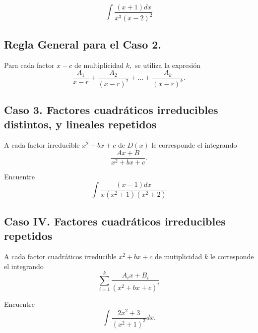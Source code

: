  \begin{resuelto}
  \label{ayr:33.8}
  $$
  \int \dfrac{(x+1)dx}{x^{3}(x-2)^{2}}
  $$
 \end{resuelto}




\subsection{Regla General para el Caso 2.}
 Para cada factor $x-c$ de multiplicidad $k,$ se utiliza la expresión
 $$
 \dfrac{A_{1}}{x-r}+\dfrac{A_{2}}{(x-r)^{2}}+...+\dfrac{A_{k}}{(x-r)^{k}}.
 $$



\subsection{Caso 3. Factores cuadráticos irreducibles distintos, y lineales repetidos}
 A cada factor irreducible $x^{2}+bx+c$ de $D(x)$ le corresponde el integrando
 $$
 \dfrac{Ax+B}{x^{2}+bx+c}.
 $$



 \begin{resuelto}
  Encuentre $$
  \int \dfrac{(x-1)dx}{x(x^{2}+1)(x^{2}+2)}
  $$
 \end{resuelto}




\subsection{Caso IV. Factores cuadráticos irreducibles repetidos}

 A cada factor cuadráticos irreducible $x^{2}+bx+c$ de mutiplicidad $k$ le corresponde el integrando
 $$
 \sum_{i=1}^{k}\dfrac{A_{i}x+B_{i}}{(x^{2}+bx+c)^{i}}
 $$




 \begin{resuelto}
  Encuentre $$\int\dfrac{2x^{2}+3}{(x^{2}+1)^{2}}dx.$$
 \end{resuelto}


